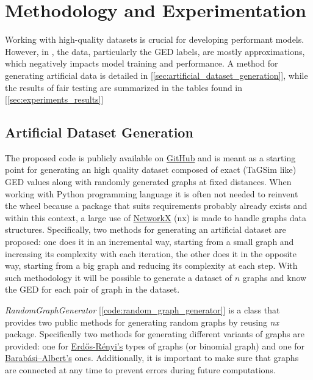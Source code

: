 \documentclass[../Thesis.tex]{subfiles}
\begin{document}
	\section{Methodology and Experimentation}
	\label{sec:methodology_and_experimentation}
	
	Working with high-quality datasets is crucial for developing performant models. However, in \cite{computing_graph_edit_distance_via_neural_graph_matching}, the data, particularly the GED labels, are mostly approximations, which negatively impacts model training and performance. A method for generating artificial data is detailed in [\autoref{sec:artificial_dataset_generation}], while the results of fair testing are summarized in the tables found in [\autoref{sec:experiments_results}]
	
	\subsection{Artificial Dataset Generation}
	\label{sec:artificial_dataset_generation}

	The proposed code is publicly available on \href{https://github.com/FedericoCalabro/gnnged/blob/vldb/1.%20synthetic_dataset_v2.ipynb}{GitHub} and is meant as a starting point for generating an high quality dataset composed of exact (TaGSim like) GED values along with randomly generated graphs at fixed distances.
	When working with Python programming language it is often not needed to reinvent the wheel because a package that suits requirements probably already exists and within this context, a large use of \href{https://networkx.org/}{NetworkX} (nx) is made to handle graphs data structures. Specifically, two methods for generating an artificial dataset are proposed: one does it in an incremental way, starting from a small graph and increasing its complexity with each iteration, the other does it in the opposite way, starting from a big graph and reducing its complexity at each step. With such methodology it will be possible to generate a dataset of $n$ graphs and know the GED for each pair of graph in the dataset.
	
	
	\textit{RandomGraphGenerator} [\autoref{code:random_graph_generator}] is a class that provides two public methods for generating random graphs by reusing \textit{nx} package. Specifically two methods for generating different variants of graphs are provided: one for \href{https://en.wikipedia.org/wiki/Erd%C5%91s%E2%80%93R%C3%A9nyi_model}{Erdős-Rényi's} types of graphs (or binomial graph) and one for \href{https://en.wikipedia.org/wiki/Barab%C3%A1si%E2%80%93Albert_model}{Barabási–Albert's} ones. Additionally, it is important to make sure that graphs are connected at any time to prevent errors during future computations. 
	
\end{document}
